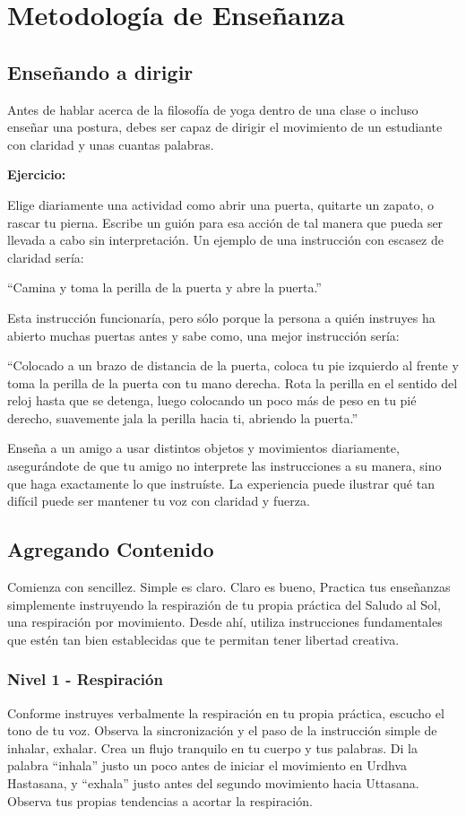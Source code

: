 \chapter{Metodología de Enseñanza}
\section{Enseñando a dirigir}
Antes de hablar acerca de la filosofía de yoga dentro de una clase o incluso enseñar una postura, debes ser capaz de dirigir el movimiento de un estudiante con claridad y unas cuantas palabras.

\textbf{Ejercicio:}

Elige diariamente una actividad como abrir una puerta, quitarte un zapato, o rascar tu pierna. Escribe un guión para esa acción de tal manera que pueda ser llevada a cabo sin interpretación. Un ejemplo de una instrucción con escasez de claridad sería:

``Camina y toma la perilla de la puerta y abre la puerta.''

Esta instrucción funcionaría, pero sólo porque la persona a qui\'en instruyes ha abierto muchas puertas antes y sabe como, una mejor instrucción sería:

``Colocado a un brazo de distancia de la puerta, coloca tu pie izquierdo al frente y toma la perilla de la puerta con tu mano derecha. Rota la perilla en el sentido del reloj hasta que se detenga, luego colocando un poco más de peso en tu pi\'e derecho, suavemente jala la perilla hacia ti, abriendo la puerta.''

Enseña a un amigo a usar distintos objetos y movimientos diariamente, asegurándote de que tu amigo no interprete las instrucciones a su manera, sino que haga exactamente lo que instruíste. La experiencia puede ilustrar qu\'e tan difícil puede ser mantener tu voz con claridad y fuerza.

\section{Agregando Contenido}
Comienza con sencillez. Simple es claro. Claro es bueno, Practica tus enseñanzas simplemente instruyendo la respirazión de tu propia práctica del Saludo al Sol, una respiración por movimiento. Desde ahí, utiliza instrucciones fundamentales que est\'en tan bien establecidas que te permitan tener libertad creativa.

\subsection{Nivel 1 - Respiración}
Conforme instruyes verbalmente la respiración en tu propia práctica, escucho el tono de tu voz. Observa la sincronización y el paso de la instrucción simple de inhalar, exhalar. Crea un flujo tranquilo en tu cuerpo y tus palabras. Di la palabra ``inhala'' justo un poco antes de iniciar el movimiento en Urdhva Hastasana, y ``exhala'' justo antes del segundo movimiento hacia Uttasana. Observa tus propias tendencias a acortar la respiración.

